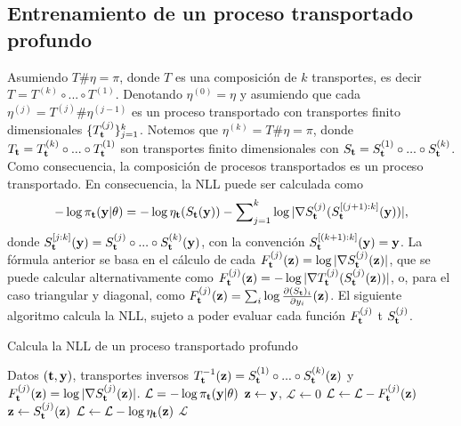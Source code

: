 \subsection{Entrenamiento de un proceso transportado profundo}
Asumiendo \(T\#\eta = \pi\), donde \(T\) es una composición de \(k\) transportes, es decir \(T = T^{(k)} \circ ... \circ T^{(1)}\). Denotando \(\eta^{(0)}=\eta\) y asumiendo que cada \(\eta^{(j)}=T^{(j)}\#\eta^{(j-1)}\) es un proceso transportado con transportes finito dimensionales \(\{T_{\mathbf{t}}^{(j)}\}_{j=1}^k\). Notemos que \(\eta^{(k)} = T\#\eta = \pi\), donde \(T_{\mathbf{t}} = T_{\mathbf{t}}^{(k)} \circ ... \circ T_{\mathbf{t}}^{(1)}\) son transportes finito dimensionales con \(S_{\mathbf{t}} = S_{\mathbf{t}}^{(1)} \circ ... \circ S_{\mathbf{t}}^{(k)}\). Como consecuencia, la composición de procesos transportados es un proceso transportado. En consecuencia, la NLL puede ser calculada como
\begin{align}
\label{eq:TGP_NLL2}
-\log \pi_{\mathbf{t}}(\mathbf{y}|\theta) = -\log \eta_{\mathbf{t}}(S_{\mathbf{t}}(\mathbf{y})) - \sum\nolimits_{j=1}^k \log |\nabla S_{\mathbf{t}}^{(j)}(S_{\mathbf{t}}^{[(j+1):k]}(\mathbf{y}))|,
\end{align}
donde \(S_{\mathbf{t}}^{[j:k]}(\mathbf{y}) = S_{\mathbf{t}}^{(j)} \circ ... \circ S_{\mathbf{t}}^{(k)} (\mathbf{y})\), con la convención \(S_{\mathbf{t}}^{[(k+1):k]}(\mathbf{y}) = \mathbf{y}\). La fórmula anterior se basa en el cálculo de cada \(F_{\mathbf{t}}^{(j)}(\mathbf{z})= \log |\nabla S_{\mathbf{t}}^{(j)}(\mathbf{z})|\), que se puede calcular alternativamente como \(F_{\mathbf{t}}^{(j)}(\mathbf{z})=- \log |\nabla T_{\mathbf{t}}^{(j)}(S_{\mathbf{t}}^{(j)}(\mathbf{z}))|\), o, para el caso triangular y diagonal, como \(F_{\mathbf{t}}^{(j)}(\mathbf{z})=\sum_{i} \log \frac{\partial (S_{\mathbf{t}})_i}{\partial y_i}(\mathbf{z})\). El siguiente algoritmo calcula la NLL, sujeto a poder evaluar cada función \(F_{\mathbf{t}}^{(j)}\) t \(S_{\mathbf{t}}^{(j)}\).

\begin{algorithm}[!h]
	\caption{Calcula la NLL de un proceso transportado profundo}
	\label{algo1}
	\begin{algorithmic} 
		\Require Datos \((\mathbf{t},\mathbf{y} )\), transportes inversos \(T^{-1}_{\mathbf{t}}(\mathbf{z}) = S_{\mathbf{t}}^{(1)} \circ ... \circ S_{\mathbf{t}}^{(k)}(\mathbf{z})\) y \(F_{\mathbf{t}}^{(j)}(\mathbf{z})=\log |\nabla S_{\mathbf{t}}^{(j)}(\mathbf{z})|\).
		\Ensure  \(\mathcal{L} = -\log \pi_{\mathbf{t}}(\mathbf{y}|\theta)\)
		\State \(\mathbf{z} \gets \mathbf{y}\), \(\mathcal{L} \gets 0\)
		\State \(\mathcal{L} \gets \mathcal{L} - F_{\mathbf{t}}^{(j)}(\mathbf{z})\)
		\State \(\mathbf{z} \gets S_{\mathbf{t}}^{(j)}(\mathbf{z})\)
		\EndFor
		\State \(\mathcal{L} \gets \mathcal{L} - \log \eta_{\mathbf{t}}(\mathbf{z})\)
		\Return \(\mathcal{L}\)
	\end{algorithmic}
\end{algorithm}

